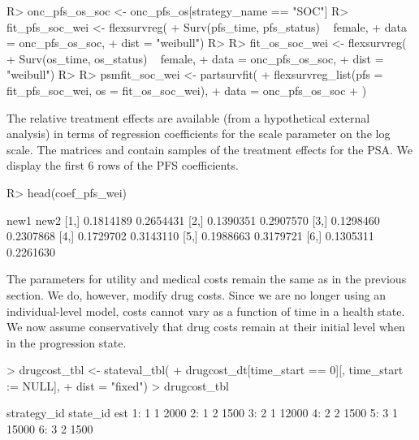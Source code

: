 \documentclass[article, nojss]{jss}\usepackage[]{graphicx}\usepackage[]{color}
\begin{document}
\begin{Schunk}
\begin{Sinput}
R> onc_pfs_os_soc <- onc_pfs_os[strategy_name == "SOC"]
R> fit_pfs_soc_wei <- flexsurvreg(
+    Surv(pfs_time, pfs_status) ~ female,
+    data = onc_pfs_os_soc,
+    dist = "weibull")
R> 
R> fit_os_soc_wei <- flexsurvreg(
+    Surv(os_time, os_status) ~  female,
+    data = onc_pfs_os_soc,
+    dist = "weibull")
R> 
R> psmfit_soc_wei <- partsurvfit(
+    flexsurvreg_list(pfs = fit_pfs_soc_wei, os = fit_os_soc_wei),
+    data = onc_pfs_os_soc
+  )
\end{Sinput}
\end{Schunk}

The relative treatment effects are available (from a hypothetical external analysis) in terms of regression coefficients for the scale parameter on the log scale. The matrices  and  contain samples of the treatment effects for the PSA. We display the first 6 rows of the PFS coefficients. 



\begin{Schunk}
\begin{Sinput}
R> head(coef_pfs_wei)
\end{Sinput}
\begin{Soutput}
          new1      new2
[1,] 0.1814189 0.2654431
[2,] 0.1390351 0.2907570
[3,] 0.1298460 0.2307868
[4,] 0.1729702 0.3143110
[5,] 0.1988663 0.3179721
[6,] 0.1305311 0.2261630
\end{Soutput}
\end{Schunk}

The parameters for utility and medical costs remain the same as in the previous section. We do, however, modify drug costs. Since we are no longer using an individual-level model, costs cannot vary as a function of time in a health state. We now assume conservatively that drug costs remain at their initial level when in the progression state.  

\begin{Schunk}
\begin{Sinput}
> drugcost_tbl <- stateval_tbl(
+   drugcost_dt[time_start ==  0][, time_start := NULL],
+   dist = "fixed")
> drugcost_tbl
\end{Sinput}
\begin{Soutput}
   strategy_id state_id   est
1:           1        1  2000
2:           1        2  1500
3:           2        1 12000
4:           2        2  1500
5:           3        1 15000
6:           3        2  1500
\end{Soutput}
\end{Schunk}
\end{document}
